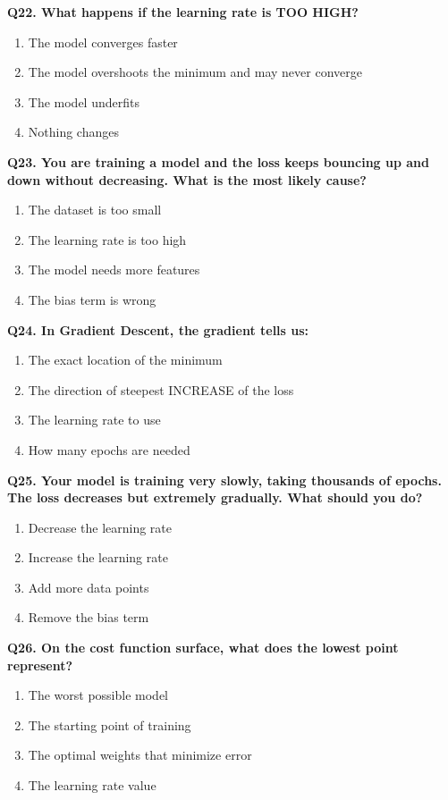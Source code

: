 \documentclass[12pt, a4paper]{article}
\newcommand{\question}[1]{\vspace{0.6em}\noindent\textbf{#1}}
\begin{document}
\question{Q22. What happens if the learning rate is TOO HIGH?}
\begin{enumerate}[label=\alph*)]
    \item The model converges faster
    \item The model overshoots the minimum and may never converge
    \item The model underfits
    \item Nothing changes
\end{enumerate}

\question{Q23. You are training a model and the loss keeps bouncing up and down without decreasing. What is the most likely cause?}
\begin{enumerate}[label=\alph*)]
    \item The dataset is too small
    \item The learning rate is too high
    \item The model needs more features
    \item The bias term is wrong
\end{enumerate}

\question{Q24. In Gradient Descent, the gradient tells us:}
\begin{enumerate}[label=\alph*)]
    \item The exact location of the minimum
    \item The direction of steepest INCREASE of the loss
    \item The learning rate to use
    \item How many epochs are needed
\end{enumerate}

\question{Q25. Your model is training very slowly, taking thousands of epochs. The loss decreases but extremely gradually. What should you do?}
\begin{enumerate}[label=\alph*)]
    \item Decrease the learning rate
    \item Increase the learning rate
    \item Add more data points
    \item Remove the bias term
\end{enumerate}

\question{Q26. On the cost function surface, what does the lowest point represent?}
\begin{enumerate}[label=\alph*)]
    \item The worst possible model
    \item The starting point of training
    \item The optimal weights that minimize error
    \item The learning rate value
\end{enumerate}
\end{document}
